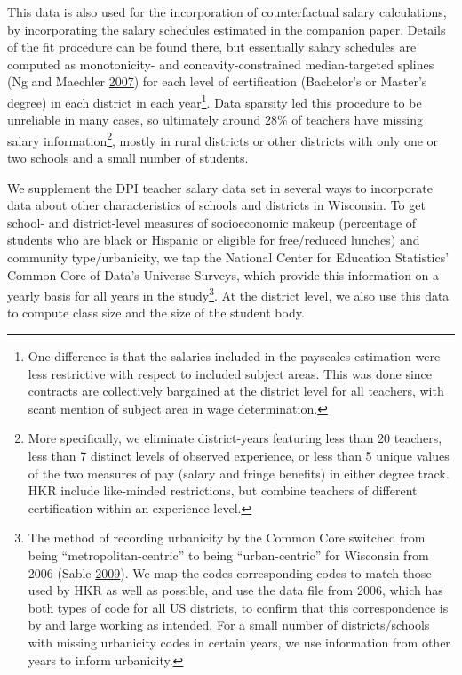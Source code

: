 \documentclass[]{article}
\let\rmarkdownfootnote\footnote%
\def\footnote{\protect\rmarkdownfootnote}
\begin{document}
This data is also used for the incorporation of counterfactual salary
calculations, by incorporating the salary schedules estimated in the
companion paper. Details of the fit procedure can be found there, but
essentially salary schedules are computed as monotonicity- and
concavity-constrained median-targeted splines (Ng and Maechler
\protect\hyperlink{ref-ng}{2007}) for each level of certification
(Bachelor's or Master's degree) in each district in each year\footnote{One
  difference is that the salaries included in the payscales estimation
  were less restrictive with respect to included subject areas. This was
  done since contracts are collectively bargained at the district level
  for all teachers, with scant mention of subject area in wage
  determination.}. Data sparsity led this procedure to be unreliable in
many cases, so ultimately around 28\% of teachers have missing salary
information\footnote{More specifically, we eliminate district-years
  featuring less than 20 teachers, less than 7 distinct levels of
  observed experience, or less than 5 unique values of the two measures
  of pay (salary and fringe benefits) in either degree track. HKR
  include like-minded restrictions, but combine teachers of different
  certification within an experience level.}, mostly in rural districts
or other districts with only one or two schools and a small number of
students.

We supplement the DPI teacher salary data set in several ways to
incorporate data about other characteristics of schools and districts in
Wisconsin. To get school- and district-level measures of socioeconomic
makeup (percentage of students who are black or Hispanic or eligible for
free/reduced lunches) and community type/urbanicity, we tap the National
Center for Education Statistics' Common Core of Data's Universe Surveys,
which provide this information on a yearly basis for all years in the
study\footnote{The method of recording urbanicity by the Common Core
  switched from being ``metropolitan-centric'' to being
  ``urban-centric'' for Wisconsin from 2006 (Sable
  \protect\hyperlink{ref-sable}{2009}). We map the codes corresponding
  codes to match those used by HKR as well as possible, and use the data
  file from 2006, which has both types of code for all US districts, to
  confirm that this correspondence is by and large working as intended.
  For a small number of districts/schools with missing urbanicity codes
  in certain years, we use information from other years to inform
  urbanicity.}. At the district level, we also use this data to compute
class size and the size of the student body.
\end{document}
